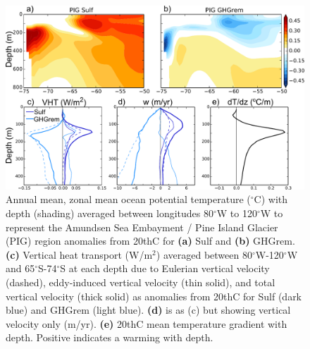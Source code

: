 \documentclass[draft,grl]{AGUTeX}  %
\begin{document}
\begin{article}
\begin{figure}[htbp] %
\centering
 \noindent\includegraphics[width=35pc]{figures/TEMPanomvertheat_justPIG.pdf}
\caption{Annual mean, zonal mean ocean potential temperature ($^\circ$C) with depth (shading) averaged between longitudes 80$^\circ$W to 120$^\circ$W to represent the Amundsen Sea Embayment / Pine Island Glacier (PIG) region anomalies from 20thC for \textbf{(a)} Sulf and \textbf{(b)} GHGrem. \textbf{(c)} Vertical heat transport (W/m$^2$) averaged between 80$^\circ$W-120$^\circ$W and 65$^\circ$S-74$^\circ$S at each depth due to Eulerian vertical velocity (dashed), eddy-induced vertical velocity (thin solid), and total vertical velocity (thick solid) as anomalies from 20thC for Sulf (dark blue) and GHGrem (light blue). \textbf{(d)} is as (c) but showing vertical velocity only (m/yr). \textbf{(e)} 20thC mean temperature gradient with depth. Positive indicates a warming with depth.}
\label{fig:pigtemp}
\end{figure}




\end{article}
\end{document}
